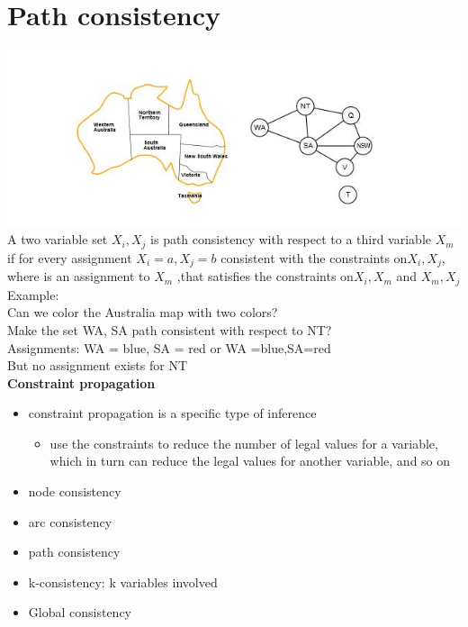 \section{Path consistency}
\includegraphics[scale=1]{chap1_pics/patchconsistency.jpeg} 
A two variable set ${X_i,X_j}$ is path consistency with respect to a third variable $X_m$ if for every assignment ${X_i = a, X_j = b}$ consistent with the constraints on${X_i, X_j}$, where is an assignment to $X_m$ ,that satisfies the constraints on${X_i , X_m}$ and ${X_m, X_j}$ \\[3ex]

Example:\\
Can we color the Australia map with two colors?\\
Make the set {WA, SA} path consistent with respect to NT?\\
Assignments: {WA = blue, SA = red} or {WA =blue,SA=red}\\
But no assignment exists for NT\\[3ex]

\textbf{Constraint propagation}
\begin{itemize}
\item constraint propagation is a specific type of inference 
\begin{itemize}
\item use the constraints to reduce the number of legal values for a variable, which in turn can reduce the legal values for another variable, and so on
\end{itemize}

\item node consistency
\item arc consistency
\item path consistency 
\item k-consistency: k variables involved
\item Global consistency 

\end{itemize}

